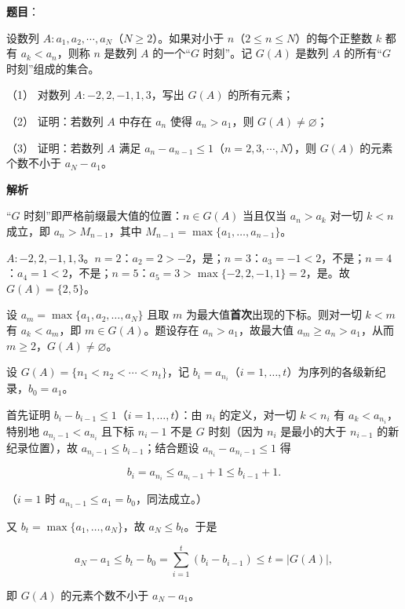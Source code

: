 \begin{answer}

\textbf{题目}：

设数列 \(A:a_{1},a_{2},\cdots,a_{N}\)（\(N\geqslant 2\)）。如果对小于 \(n\)（\(2\leqslant n\leqslant N\)）的每个正整数 \(k\) 都有 \(a_{k}<a_{n}\)，则称 \(n\) 是数列 \(A\) 的一个“\(G\) 时刻”。记 \(G(A)\) 是数列 \(A\) 的所有“\(G\) 时刻”组成的集合。

（1） 对数列 \(A:-2,2,-1,1,3\)，写出 \(G(A)\) 的所有元素；

（2） 证明：若数列 \(A\) 中存在 \(a_{n}\) 使得 \(a_{n}>a_{1}\)，则 \(G(A)\neq\varnothing\)；

（3） 证明：若数列 \(A\) 满足 \(a_{n}-a_{n-1}\leqslant 1\)（\(n=2,3,\cdots,N\)），则 \(G(A)\) 的元素个数不小于 \(a_{N}-a_{1}\)。

\textbf{解析}

“\(G\) 时刻”即严格前缀最大值的位置：\(n\in G(A)\) 当且仅当 \(a_n>a_k\) 对一切 \(k<n\) 成立，即 \(a_n>M_{n-1}\)，其中 \(M_{n-1}=\max\{a_1,\dots,a_{n-1}\}\)。


\(A:-2,2,-1,1,3\)。\(n=2\)：\(a_2=2>-2\)，是；\(n=3\)：\(a_3=-1<2\)，不是；\(n=4\)：\(a_4=1<2\)，不是；\(n=5\)：\(a_5=3>\max\{-2,2,-1,1\}=2\)，是。故 \(G(A)=\{2,5\}\)。


设 \(a_m=\max\{a_1,a_2,\dots,a_N\}\) 且取 \(m\) 为最大值\textbf{首次}出现的下标。则对一切 \(k<m\) 有 \(a_k<a_m\)，即 \(m\in G(A)\)。题设存在 \(a_n>a_1\)，故最大值 \(a_m\geqslant a_n>a_1\)，从而 \(m\geqslant2\)，\(G(A)\neq\varnothing\)。



设 \(G(A)=\{n_1<n_2<\cdots<n_t\}\)，记 \(b_i=a_{n_i}\)（\(i=1,\dots,t\)）为序列的各级新纪录，\(b_0=a_1\)。

首先证明 \(b_i-b_{i-1}\leqslant1\)（\(i=1,\dots,t\)）：由 \(n_i\) 的定义，对一切 \(k<n_i\) 有 \(a_k<a_{n_i}\)，特别地 \(a_{n_i-1}<a_{n_i}\) 且下标 \(n_i-1\) 不是 \(G\) 时刻（因为 \(n_i\) 是最小的大于 \(n_{i-1}\) 的新纪录位置），故 \(a_{n_i-1}\leqslant b_{i-1}\)；结合题设 \(a_{n_i}-a_{n_i-1}\leqslant1\) 得

\nopagebreak[4]
\[
b_i=a_{n_i}\leqslant a_{n_i-1}+1\leqslant b_{i-1}+1 .
\]

（\(i=1\) 时 \(a_{n_1-1}\leqslant a_1=b_0\)，同法成立。）

又 \(b_t=\max\{a_1,\dots,a_N\}\)，故 \(a_N\leqslant b_t\)。于是

\nopagebreak[4]
\[
a_N-a_1\leqslant b_t-b_0=\sum_{i=1}^{t}(b_i-b_{i-1})\leqslant t=|G(A)|,
\]

即 \(G(A)\) 的元素个数不小于 \(a_N-a_1\)。




\end{answer}